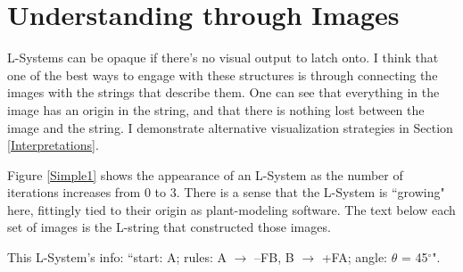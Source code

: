 \documentclass[12pt,twoside]{reedthesis}
\newcommand{\code}[1]{\texttt{#1}}
\begin{document}
\section{Understanding through Images}
\label{Understanding-through-Images}

	L-Systems can be opaque if there's no visual output to latch onto. I think that one of the best ways to engage with these structures is through connecting the images with the strings that describe them. One can see that everything in the image has an origin in the string, and that there is nothing lost between the image and the string. I demonstrate alternative visualization strategies in Section \ref{Interpretations}.
	
	Figure \ref{Simple1} shows the appearance of an L-System as the number of iterations increases from 0 to 3. There is a sense that the L-System is ``growing" here, fittingly tied to their origin as plant-modeling software. The text below each set of images is the L-string that constructed those images.

	This L-System's info: ``start: A; rules: A $\rightarrow$ –FB, B $\rightarrow$ +FA; angle: $\theta$ = 45$^{\circ}$".

\end{document}
